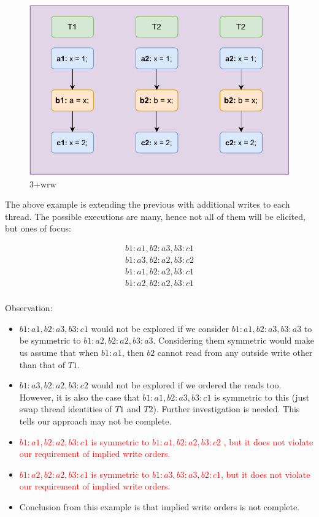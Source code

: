
        \begin{figure}[H]
            \centering
            \includegraphics[scale=0.7]{Example4(3+wrw).pdf}
            \caption{3+wrw}
        \end{figure}

        The above example is extending the previous with additional writes to each thread. The possible executions are many, hence not all of them will be elicited, but ones of focus: 
        
        \begin{align*}
            b1:a1 , b2:a3 , b3:c1 \\
            b1:a3 , b2:a2 , b3:c2 \\
            b1:a1 , b2:a2 , b3:c1 \\
            b1:a2 , b2:a2 , b3:c1 \\
        \end{align*}

        Observation:
        \begin{itemize}
            \item $b1:a1 , b2:a3 , b3:c1$ would not be explored if we consider $b1:a1 , b2:a3 , b3:a3$ to be symmetric to $b1:a2 , b2:a2 , b3:a3$. Considering them symmetric would make us assume that when $b1:a1$, then $b2$ cannot read from any outside write other than that of $T1$. 
            \item $b1:a3 , b2:a2 , b3:c2$ would not be explored if we ordered the reads too. However, it is also the case that $b1:a1 , b2:a3 , b3:c1$ is symmetric to this (just swap thread identities of $T1$ and $T2$). Further investigation is needed. This tells our approach may not be complete. 
            \item \textcolor{red}{$b1:a1 , b2:a2 , b3:c1$ is symmetric to $b1:a1 , b2:a2 , b3:c2$ , but it does not violate our requirement of implied write orders.}
            \item \textcolor{red}{$b1:a2 , b2:a2 , b3:c1$ is symmetric to $b1:a3, b3:a3, b2:c1$, but it does not violate our requirement of implied write orders.} 
            \item Conclusion from this example is that implied write orders is not complete. 
        \end{itemize}

